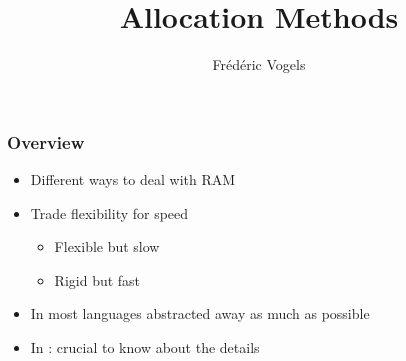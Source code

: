 \usepackage{fourier}
\usepackage{bbding}
\usepackage{ucll-code}

\usetikzlibrary{shadows,shapes.multipart}

\title{Allocation Methods}
\author{Fr\'ed\'eric Vogels}






\begin{frame}
  \titlepage
\end{frame}

\begin{frame}
  \frametitle{Overview}
  \begin{itemize}
    \item Different ways to deal with RAM
    \item Trade flexibility for speed
          \begin{itemize}
            \item Flexible but slow
            \item Rigid but fast
          \end{itemize}
    \item In most languages abstracted away as much as possible
    \item In \cpp: crucial to know about the details
  \end{itemize}
\end{frame}






